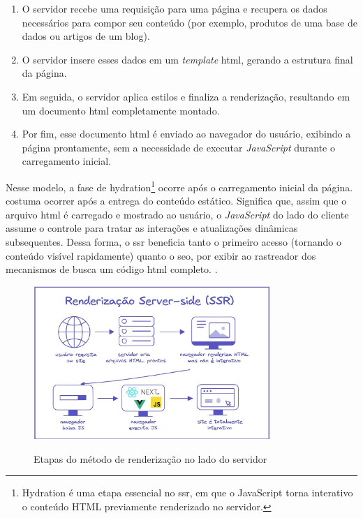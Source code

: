 \begin{enumerate}
    \item O servidor recebe uma requisição para uma página e recupera os dados necessários para compor seu conteúdo (por exemplo, produtos de uma base de dados ou artigos de um blog).
    \item O servidor insere esses dados em um \emph{template} \acrshort{html}, gerando a estrutura final da página.
    \item Em seguida, o servidor aplica estilos e finaliza a renderização, resultando em um documento \acrshort{html} completamente montado.
    \item Por fim, esse documento \acrshort{html} é enviado ao navegador do usuário, exibindo a página prontamente, sem a necessidade de executar \emph{JavaScript} durante o carregamento inicial.
\end{enumerate}

Nesse modelo, a fase de hydration\footnote{Hydration é uma etapa essencial no \acrshort{ssr}, em que o JavaScript torna interativo o conteúdo HTML previamente renderizado no servidor.} ocorre após o carregamento inicial da página. costuma ocorrer após a entrega do conteúdo estático. Significa que, assim que o arquivo \acrshort{html} é carregado e mostrado ao usuário, o \emph{JavaScript} do lado do cliente assume o controle para tratar as interações e atualizações dinâmicas subsequentes. Dessa forma, o \acrshort{ssr} beneficia tanto o primeiro acesso (tornando o conteúdo visível rapidamente) quanto o \acrshort{seo}, por exibir ao rastreador dos mecanismos de busca um código \acrshort{html} completo. \cite{atori2024}.

\begin{figure}[H]
  \centering
  \caption{Etapas do método de renderização no lado do servidor}
  \includegraphics[width=0.8\textwidth]{media/server_side_rendering.jpeg}
  \label{fig:server_side_rendering}
\end{figure}

